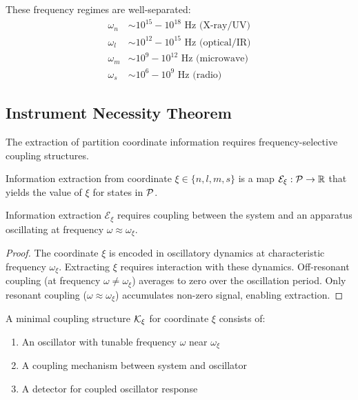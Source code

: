 These frequency regimes are well-separated:
\begin{align}
\omega_n &\sim 10^{15} - 10^{18} \text{ Hz (X-ray/UV)} \\
\omega_l &\sim 10^{12} - 10^{15} \text{ Hz (optical/IR)} \\
\omega_m &\sim 10^{9} - 10^{12} \text{ Hz (microwave)} \\
\omega_s &\sim 10^{6} - 10^{9} \text{ Hz (radio)}
\end{align}

\subsection{Instrument Necessity Theorem}

The extraction of partition coordinate information requires frequency-selective coupling structures.

\begin{definition}
\label{def:extraction}
Information extraction from coordinate $\xi \in \{n, l, m, s\}$ is a map $\mathcal{E}_\xi: \mathcal{P} \to \mathbb{R}$ that yields the value of $\xi$ for states in $\mathcal{P}$.
\end{definition}

\begin{theorem}
\label{thm:coupling_necessity}
Information extraction $\mathcal{E}_\xi$ requires coupling between the system and an apparatus oscillating at frequency $\omega \approx \omega_\xi$.
\end{theorem}

\begin{proof}
The coordinate $\xi$ is encoded in oscillatory dynamics at characteristic frequency $\omega_\xi$. Extracting $\xi$ requires interaction with these dynamics. Off-resonant coupling (at frequency $\omega \neq \omega_\xi$) averages to zero over the oscillation period. Only resonant coupling ($\omega \approx \omega_\xi$) accumulates non-zero signal, enabling extraction.
\end{proof}

\begin{definition}
\label{def:minimal_coupling}
A minimal coupling structure $\mathcal{K}_\xi$ for coordinate $\xi$ consists of:
\begin{enumerate}
\item An oscillator with tunable frequency $\omega$ near $\omega_\xi$
\item A coupling mechanism between system and oscillator
\item A detector for coupled oscillator response
\end{enumerate}
\end{definition}

